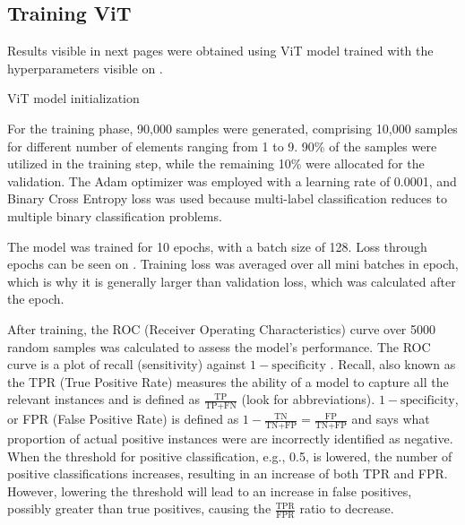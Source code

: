 \subsection{Training ViT}
Results visible in next pages were obtained using ViT model trained with the hyperparameters visible on .

\newenvironment{longlistingI}{\captionsetup{type=listing, width=0.8\textwidth}}{}
\begin{longlistingI}
    \caption{ViT model initialization}
    \label{lst:vit-hyperparameters}
\end{longlistingI}
\vspace{12pt}

For the training phase, 90,000 samples were generated, comprising 10,000 samples for different number of elements ranging from 1 to 9. 
90\% of the samples were utilized in the training step, while the remaining 10\% were allocated for the validation. 
The Adam optimizer was employed with a learning rate of 0.0001, and Binary Cross Entropy loss was used because multi-label classification reduces to multiple binary classification problems.

The model was trained for 10 epochs, with a batch size of 128. 
Loss through epochs can be seen on . 
Training loss was averaged over all mini batches in epoch, which is why it is generally larger than validation loss, which was calculated after the epoch. 

After training, the ROC (Receiver Operating Characteristics) curve over 5000 random samples was calculated to assess the model's performance. 
The ROC curve is a plot of recall (sensitivity) against $1-\text{specificity}$ \cite{rocCurve}.
Recall, also known as the TPR (True Positive Rate) measures the ability of a model to capture all the relevant instances and is defined as \(\frac{\text{TP}}{\text{TP} + \text{FN}}\) (look  for abbreviations).
$1-\text{specificity}$, or FPR (False Positive Rate) is defined as \(1 - \frac{\text{TN}}{\text{TN} + \text{FP}} = \frac{\text{FP}}{\text{TN} + \text{FP}}\) and says what proportion of actual positive instances were are incorrectly identified as negative.
When the threshold for positive classification, e.g., 0.5, is lowered, the number of positive classifications increases, resulting in an increase of both TPR and FPR. 
However, lowering the threshold will lead to an increase in false positives, possibly greater than true positives, causing the \(\frac{\text{TPR}}{\text{FPR}}\) ratio to decrease.

